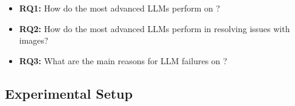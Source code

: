\begin{itemize}

    \item \textbf{RQ1:} How do the most advanced LLMs perform on \Swebenchx? 
    \item \textbf{RQ2:} How do the most advanced LLMs perform in resolving issues with images?
    \item \textbf{RQ3:} What are the main reasons for LLM failures on \Swebenchx?
\end{itemize}

\subsection{Experimental Setup}








